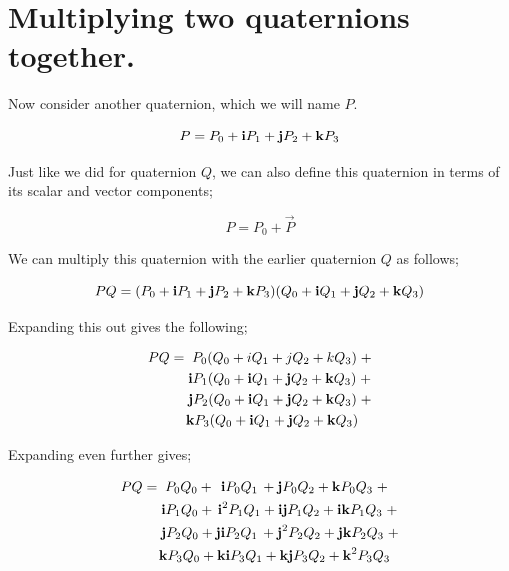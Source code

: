 \chapter{Multiplying two quaternions together.}

Now consider another quaternion, which we will name \(P\).

\begin{equation*}
P = P_0 + \bm{\mathrm{i}} P_1 + \bm{\mathrm{j}} P_2 + \bm{\mathrm{k}}P_3
\end{equation*}
\vspace{0.0\baselineskip}

Just like we did for quaternion \(Q\), we can also define this quaternion in terms of its scalar and vector components;

\begin{equation*}
P = P_0 + \vec{P}
\end{equation*}
\vspace{0.0\baselineskip}

We can multiply this quaternion with the earlier quaternion \(Q\) as follows;

\begin{equation*}
PQ = (P_0 + \bm{\mathrm{i}} P_1 + \bm{\mathrm{j}} P_2 + \bm{\mathrm{k}}P_3)(Q_0 + \bm{\mathrm{i}} Q_1 + \bm{\mathrm{j}} Q_2 + \bm{\mathrm{k}}Q_3)
\end{equation*}
\vspace{0.0\baselineskip}

Expanding this out gives the following;

\begin{align*}
PQ = {}& \;   P_0(Q_0 + iQ_1 + jQ_2 + kQ_3) \; + \\
       &     \bm{\mathrm{i}} P_1(Q_0 + \bm{\mathrm{i}} Q_1 + \bm{\mathrm{j}} Q_2 + \bm{\mathrm{k}}Q_3) \; + \\
       &     \bm{\mathrm{j}} P_2(Q_0 + \bm{\mathrm{i}} Q_1 + \bm{\mathrm{j}} Q_2 + \bm{\mathrm{k}}Q_3) \; + \\
       & \!  \bm{\mathrm{k}}P_3(Q_0 + \bm{\mathrm{i}} Q_1 + \bm{\mathrm{j}} Q_2 + \bm{\mathrm{k}}Q_3)
\end{align*}

Expanding even further gives;

\begin{align*}
PQ = {}& \;                P_0Q_0      + \;\, \bm{\mathrm{i}} P_0Q_1 \,  + \bm{\mathrm{j}} P_0Q_2 +   \bm{\mathrm{k}}P_0Q_3 \;  + \\
       &     \bm{\mathrm{i}} P_1Q_0      + \,   \bm{\mathrm{i}}^2P_1Q_1   + \bm{\mathrm{ij}}P_1Q_2 +  \bm{\mathrm{ik}}P_1Q_3 \; + \\
       &     \bm{\mathrm{j}} P_2Q_0 \,\! + \,\! \bm{\mathrm{ji}}P_2Q_1 \, + \bm{\mathrm{j}}^2P_2Q_2 + \bm{\mathrm{jk}}P_2Q_3 \; + \\
       & \!  \bm{\mathrm{k}}P_3Q_0      +      \bm{\mathrm{ki}}P_3Q_1    + \bm{\mathrm{kj}}P_3Q_2 +  \bm{\mathrm{k}}^2P_3Q_3
\end{align*}

